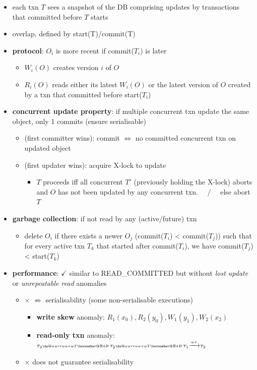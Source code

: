 \documentclass[10pt, landscape]{article}
\makeatletter
\newcommand*{\xdashrightarrow}[2][]{%
  \mathrel{%
    \mathpalette{\da@xarrow{#1}{#2}{}\da@rightarrow{\,}{}}{}%
  }%
}
\newcommand*{\da@rightarrow}{\mathchar"0\hexnumber@\symAMSa 4B }
\newcommand*{\da@xarrow}[7]{%
  \sbox0{$\ifx#7\scriptstyle\scriptscriptstyle\else\scriptstyle\fi#5#1#6\m@th$}%
  \sbox2{$\ifx#7\scriptstyle\scriptscriptstyle\else\scriptstyle\fi#5#2#6\m@th$}%
  \sbox4{$#7\dabar@\m@th$}%
  \dimen@=\wd0 %
  \ifdim\wd2 >\dimen@
    \dimen@=\wd2 %
  \fi
  \count@=2 %
  \def\da@bars{\dabar@\dabar@}%
  \@whiledim\count@\wd4<\dimen@\do{%
    \advance\count@\@ne
    \expandafter\def\expandafter\da@bars\expandafter{%
      \da@bars
      \dabar@ 
    }%
  }%
  \mathrel{#3}%
  \mathrel{%
    \mathop{\da@bars}\limits
    \ifx\\#1\\%
    \else
      _{\copy0}%
    \fi
    \ifx\\#2\\%
    \else
      ^{\copy2}%
    \fi
  }%
  \mathrel{#4}%
}
\makeatother
\begin{document}
\begin{multicols*}{4}
  \begin{itemize}
    \item each txn $T$ sees a snapshot of the DB comprising updates by transactions that committed before $T$ starts
    \item {} overlap, defined by start(T)/commit(T)
    \item \textbf{protocol}: $O_i$ is more recent if commit($T_i$) is later
      \begin{itemize}
        \item $W_i(O)$ creates version $i$ of $O$ 
        \item $R_i(O)$ reads either its latest $W_i(O)$ or the latest version of $O$ created by a txn that committed before start($T_i$)
      \end{itemize}
    \item \textbf{concurrent update property}: if multiple concurrent txn update the same object, only 1 commits (ensure serialisable)
      \begin{itemize}
        \item {} (first committer wins): commit $\iff$ no committed concurrent txn on updated object
        \item {} (first updater wins): acquire X-lock to update
          \begin{itemize}
            \item $T$ proceeds iff all concurrent $T'$ (previously holding the X-lock) aborts and $O$ has not been updated by any concurrent txn. $\quad/\quad$ else abort $T$
          \end{itemize}
      \end{itemize}
    \item \textbf{garbage collection}: if not read by any (active/future) txn
      \begin{itemize}
        \item delete $O_i$ if there exists a newer $O_j$ (commit($T_i$) < commit($T_j$)) such that for every active txn $T_k$ that started after commit($T_i$),  we have commit($T_j$) < start($T_k$)
      \end{itemize}
    \item \textbf{performance}: $\checkmark$ similar to READ\_COMMITTED but without \textit{lost update} or \textit{unrepeatable read} anomalies
      \begin{itemize}
        \item $\times$ $\not\Rightarrow$ serialisability (some non-serialisable executions)
          \begin{itemize}
            \item \textbf{write skew} anomaly: $\scriptscriptstyle R_1(x_0), R_2(y_0), W_1(y_1), W_2(x_2)$
            \item \textbf{read-only txn} anomaly: $\scriptscriptstyle T_3 \xdashrightarrow{rw} T_2 \xdashrightarrow{rw} T_1 \xrightarrow{wr} T_3$
          \end{itemize}
        \item $\times$ does not guarantee serialisability
      \end{itemize}
  \end{itemize}


\end{multicols*}
\end{document}
